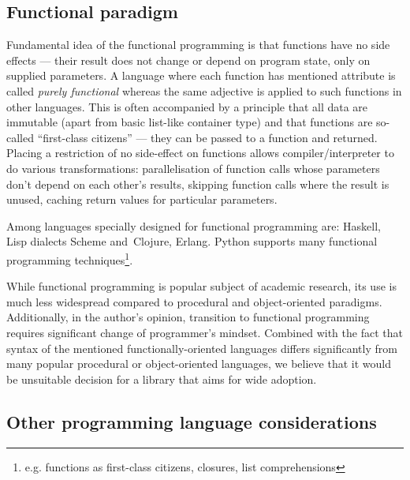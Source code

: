 \subsection{Functional paradigm}
Fundamental idea of the functional programming is that
functions have no side effects --- their result does not change or depend on program state, only
on supplied parameters. A language where each function has mentioned attribute is called
\emph{purely functional} whereas the same adjective is applied to such functions in other
languages. This is often accompanied by a principle that all data are immutable (apart from
basic list-like container type) and that functions are so-called ``first-class citizens''
--- they can be passed to a function and returned. Placing a restriction of no side-effect on
functions allows compiler/interpreter to do various transformations: parallelisation of function
calls whose parameters don't depend on each other's results, skipping function calls where the
result is unused, caching return values for particular parameters.

Among languages specially designed for functional programming are: Haskell, Lisp dialects Scheme
and~Clojure, Erlang. Python supports many functional programming techniques\footnote{e.g. functions
as first-class citizens, closures, list comprehensions}.

While functional programming is popular subject of academic research, its use is much less
widespread compared to procedural and object-oriented paradigms. Additionally, in the author's
opinion, transition to functional programming requires significant change of programmer's
mindset. Combined with the fact that syntax of the mentioned functionally-oriented languages differs
significantly from many popular procedural or object-oriented languages, we believe that it would
be unsuitable decision for a library that aims for wide adoption.

\subsection{Other programming language considerations}


